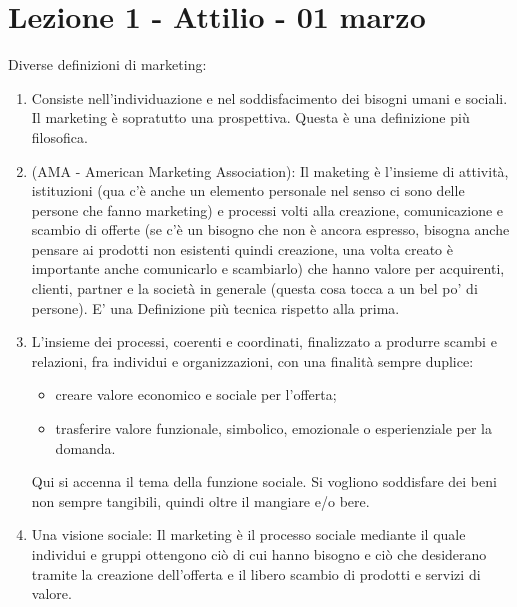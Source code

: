 \documentclass[11pt]{article}
\begin{document}
\section{Lezione 1 - Attilio - 01 marzo}
Diverse definizioni di marketing:
\begin{enumerate}[noitemsep,topsep=0ex]
	\item Consiste nell'individuazione e nel soddisfacimento dei bisogni umani e sociali. 
	Il marketing è sopratutto una prospettiva. 
	Questa è una definizione più filosofica.
	
	\item (AMA - American Marketing Association): Il maketing è l'insieme di attività, istituzioni (qua c'è anche un elemento personale nel senso ci sono delle persone che fanno marketing) e processi volti alla creazione, comunicazione e scambio di offerte (se c'è un bisogno che non è ancora espresso, bisogna anche pensare ai prodotti non esistenti quindi creazione, una volta creato è importante anche comunicarlo e scambiarlo) che hanno valore per acquirenti, clienti, partner e la società in generale (questa cosa tocca a un bel po' di persone). 
	E' una Definizione più tecnica rispetto alla prima.
	
	\item L'insieme dei processi, coerenti e coordinati, finalizzato a produrre scambi e relazioni, fra individui e organizzazioni, con una finalità sempre duplice: 
	\begin{itemize}[noitemsep]
		\item creare valore economico e sociale per l'offerta;
		\item trasferire valore funzionale, simbolico, emozionale o esperienziale per la domanda.
	\end{itemize} 
	Qui si accenna il tema della funzione sociale. 
	Si vogliono soddisfare dei beni non sempre tangibili, quindi oltre il mangiare e/o bere.
	
	\item Una visione sociale: Il marketing è il processo sociale mediante il quale individui e gruppi ottengono ciò di cui hanno bisogno e ciò che desiderano tramite la creazione dell'offerta e il libero scambio di prodotti e servizi di valore.
\end{enumerate}
\end{document}
